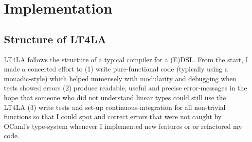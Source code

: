 \chapter{Implementation}\label{chap:impl}


%

\section{Structure of LT4LA}

LT4LA follows the structure of a typical compiler for a (E)DSL\@. From the
start, I made a concerted effort to (1) write pure-functional code (typically
using a monadic-style) which helped immensely with modularity and debugging
when tests showed errors (2) produce readable, useful and precise
error-messages in the hope that someone who did not understand linear types
could still use the LT4LA (3) write tests and set-up
continuous-integration for all non-trivial functions so that I could spot and
correct errors that were not caught by OCaml's type-system whenever I
implemented new features or or refactored my code.

